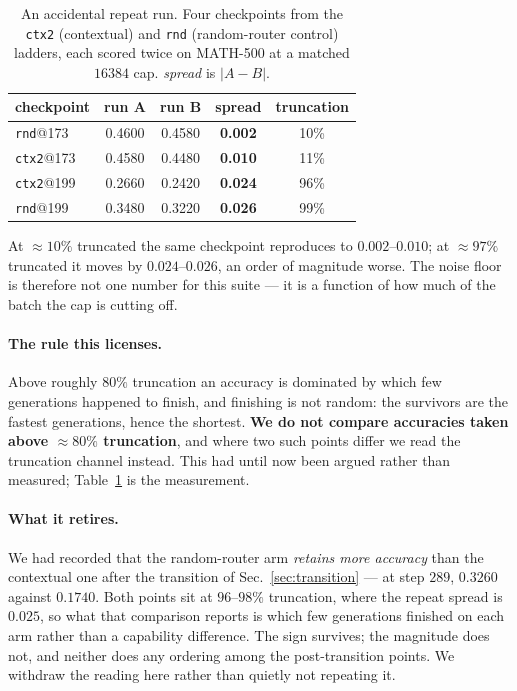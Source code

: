 \begin{table}[t]
\centering\small
\caption{An accidental repeat run. Four checkpoints from the \texttt{ctx2} (contextual) and
\texttt{rnd} (random-router control) ladders, each scored twice on MATH-500 at a matched
$16384$ cap. \emph{spread} is $|A - B|$.}
\label{tab:noisetrunc}
\begin{tabular}{lcccc}
\toprule
checkpoint & run A & run B & spread & truncation \\
\midrule
\texttt{rnd}@173  & 0.4600 & 0.4580 & \textbf{0.002} & 10\% \\
\texttt{ctx2}@173 & 0.4580 & 0.4480 & \textbf{0.010} & 11\% \\
\texttt{ctx2}@199 & 0.2660 & 0.2420 & \textbf{0.024} & 96\% \\
\texttt{rnd}@199  & 0.3480 & 0.3220 & \textbf{0.026} & 99\% \\
\bottomrule
\end{tabular}
\end{table}

At $\approx 10\%$ truncated the same checkpoint reproduces to $0.002$--$0.010$; at $\approx
97\%$ truncated it moves by $0.024$--$0.026$, an order of magnitude worse. The noise floor is
therefore not one number for this suite --- it is a function of how much of the batch the cap
is cutting off.

\paragraph{The rule this licenses.} Above roughly $80\%$ truncation an accuracy is dominated
by which few generations happened to finish, and finishing is not random: the survivors are
the fastest generations, hence the shortest. \textbf{We do not compare accuracies taken above
$\approx 80\%$ truncation}, and where two such points differ we read the truncation channel
instead. This had until now been argued rather than measured; Table~\ref{tab:noisetrunc} is
the measurement.

\paragraph{What it retires.} We had recorded that the random-router arm \emph{retains more
accuracy} than the contextual one after the transition of Sec.~\ref{sec:transition} --- at
step $289$, $0.3260$ against $0.1740$. Both points sit at $96$--$98\%$ truncation, where the
repeat spread is $0.025$, so what that comparison reports is which few generations finished on
each arm rather than a capability difference. The sign survives; the magnitude does not, and
neither does any ordering among the post-transition points. We withdraw the reading here
rather than quietly not repeating it.

